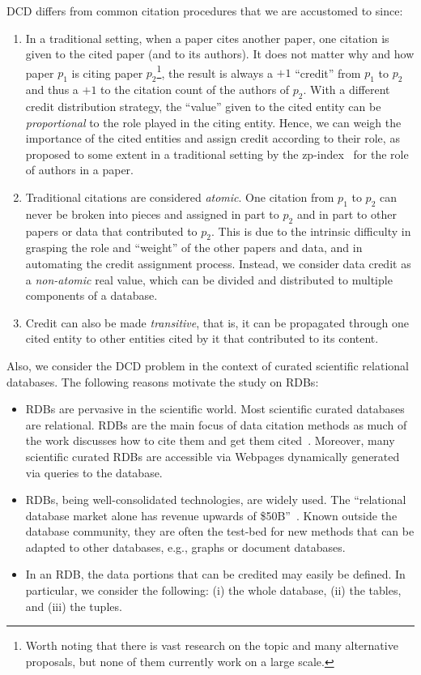 DCD differs from common citation procedures that we are accustomed to since:
\begin{enumerate}
    \item In a traditional setting, when a paper cites another paper, one citation is given to the cited paper (and to its authors). It does not matter why and how paper $p_1$ is citing paper $p_2$\footnote{Worth noting that there is vast research on the topic and many alternative proposals, but none of them currently work on a large scale.}, the result is always a $+1$ ``credit'' from $p_1$ to $p_2$ and thus a $+1$ to the citation count of the authors of $p_2$. With a different credit distribution strategy, the ``value'' given to the cited entity can be \emph{proportional} to the role played in the citing entity. Hence, we can weigh the importance of the cited entities and assign credit according to their role, as proposed to some extent in a traditional setting by the zp-index~\citep{ZouP16} for the role of authors in a paper.
    \item Traditional citations are considered \emph{atomic}. One citation from $p_1$ to $p_2$ can never be broken into pieces and assigned in part to $p_2$ and in part to other papers or data that contributed to $p_2$. This is due to the intrinsic difficulty in grasping the role and ``weight'' of the other papers and data, and in automating the credit assignment process.
	Instead, we consider data credit as a \emph{non-atomic} real value, which can be divided and distributed to multiple components of a database. 
	\item Credit can also be made \emph{transitive}, that is, it can be propagated through one cited entity to other entities cited by it that contributed to its content.
\end{enumerate}

Also, we consider the DCD problem in the context of curated scientific relational databases.
The following reasons motivate the study on RDBs:
\begin{itemize}
\item RDBs are pervasive in the scientific world. Most scientific curated databases are relational. RDBs are the main focus of data citation methods as much of the work discusses how to cite them and get them cited~\citep{buneman2010rule,bunemann2016citation,ProllR13}.  Moreover, many scientific curated RDBs are accessible via Webpages dynamically generated via queries to the database.
\item RDBs, being well-consolidated technologies, are widely used. The ``relational database
market alone has revenue upwards of \$50B''~\citep{AbadiEtAl2020}. Known outside the database community, they are often the test-bed for new methods that can be adapted to other databases, e.g., graphs or document databases.
\item In an RDB, the data portions that can be credited may easily be defined.
            In particular, we consider the following: (i) the whole database, (ii) the tables, and (iii) the tuples.
\end{itemize}

